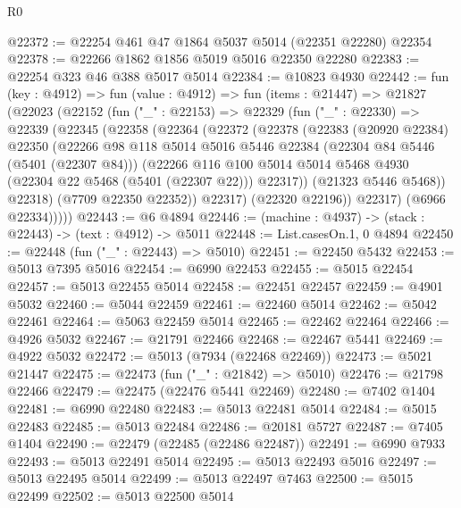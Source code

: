 \begin{lexlean}{R0}
\begin{coremodule}
@22372 := @22254 @461 @47 @1864 @5037 @5014 (@22351 @22280) @22354
@22378 := @22266 @1862 @1856 @5019 @5016 @22350 @22280
@22383 := @22254 @323 @46 @388 @5017 @5014
@22384 := @10823 @4930
@22442 := fun (key : @4912) =>
  fun (value : @4912) =>
  fun (items : @21447) =>
  @21827
    (@22023
      (@22152
        (fun ("_" : @22153) =>
        @22329
          (fun ("_" : @22330) =>
          @22339
            (@22345
              (@22358
                (@22364
                  (@22372
                    (@22378
                      (@22383
                        (@20920 @22384)
                        @22350
                        (@22266
                          @98
                          @118
                          @5014
                          @5016
                          @5446
                          @22384
                          (@22304 @84 @5446 (@5401 (@22307 @84)))
                          (@22266
                            @116
                            @100
                            @5014
                            @5014
                            @5468
                            @4930
                            (@22304 @22 @5468 (@5401 (@22307 @22)))
                            @22317))
                        (@21323 @5446 @5468))
                      @22318)
                    (@7709 @22350 @22352))
                  @22317)
                (@22320 @22196))
              @22317)
            (@6966 @22334)))))
@22443 := @6 @4894
@22446 := (machine : @4937) -> (stack : @22443) -> (text : @4912) -> @5011
@22448 := List.casesOn.{1, 0} @4894
@22450 := @22448 (fun ("_" : @22443) => @5010)
@22451 := @22450 @5432
@22453 := @5013 @7395 @5016
@22454 := @6990 @22453
@22455 := @5015 @22454
@22457 := @5013 @22455 @5014
@22458 := @22451 @22457
@22459 := @4901 @5032
@22460 := @5044 @22459
@22461 := @22460 @5014
@22462 := @5042 @22461
@22464 := @5063 @22459 @5014
@22465 := @22462 @22464
@22466 := @4926 @5032
@22467 := @21791 @22466
@22468 := @22467 @5441
@22469 := @4922 @5032
@22472 := @5013 (@7934 (@22468 @22469))
@22473 := @5021 @21447
@22475 := @22473 (fun ("_" : @21842) => @5010)
@22476 := @21798 @22466
@22479 := @22475 (@22476 @5441 @22469)
@22480 := @7402 @1404
@22481 := @6990 @22480
@22483 := @5013 @22481 @5014
@22484 := @5015 @22483
@22485 := @5013 @22484
@22486 := @20181 @5727
@22487 := @7405 @1404
@22490 := @22479 (@22485 (@22486 @22487))
@22491 := @6990 @7933
@22493 := @5013 @22491 @5014
@22495 := @5013 @22493 @5016
@22497 := @5013 @22495 @5014
@22499 := @5013 @22497 @7463
@22500 := @5015 @22499
@22502 := @5013 @22500 @5014

\end{coremodule}
\end{lexlean}
